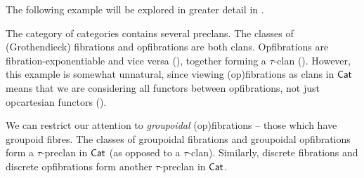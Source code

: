 \begin{example}\label{ex:categories-and-fibrations}
  The following example will be explored in greater detail in .

  The category of categories contains several preclans.
  The classes of (Grothendieck) fibrations and opfibrations are both clans.
  Opfibrations are fibration-exponentiable and vice versa
  (),
  together forming a $\tau$-clan ().
  However, this example is somewhat unnatural,
  since viewing (op)fibrations as clans in $\mathsf{Cat}$ means that
  we are considering all functors between opfibrations,
  not just opcartesian functors ().

  We can restrict our attention to
  \emph{groupoidal} (op)fibrations --
  those which have groupoid fibres.
  The classes of groupoidal fibrations and
  groupoidal opfibrations form a $\tau$-preclan in $\mathsf{Cat}$
  (as opposed to a $\tau$-clan).
  Similarly, discrete fibrations and discrete opfibrations form another $\tau$-preclan in $\mathsf{Cat}$.


\end{example}
